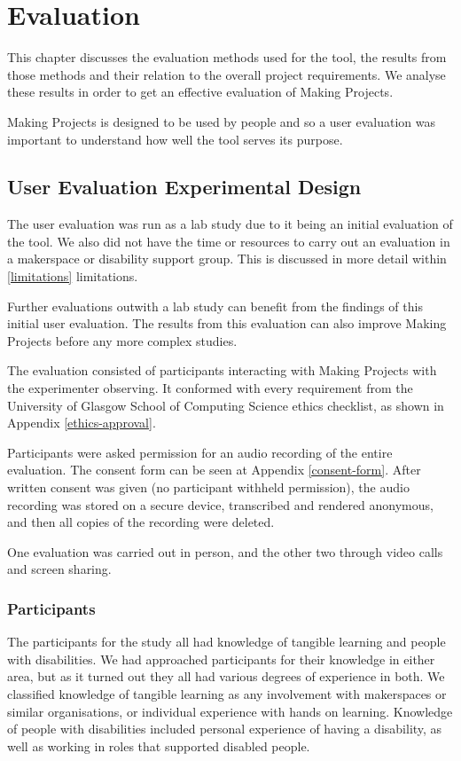 \documentclass{l4proj}
\begin{document}
\chapter{Evaluation} 
\label{evaluation}
This chapter discusses the evaluation methods used for the tool, the results from those methods and their relation to the overall project requirements. We analyse these results in order to get an effective evaluation of Making Projects. 

Making Projects is designed to be used by people and so a user evaluation was important to understand how well the tool serves its purpose. 


\section{User Evaluation Experimental Design}
The user evaluation was run as a lab study due to it being an initial evaluation of the tool. We also did not have the time or resources to carry out an evaluation in a makerspace or disability support group. This is discussed in more detail within \ref{limitations} limitations.

Further evaluations outwith a lab study can benefit from the findings of this initial user evaluation. The results from this evaluation can also improve Making Projects before any more complex studies. 

The evaluation consisted of participants interacting with Making Projects with the experimenter observing. It conformed with every requirement from the University of Glasgow School of Computing Science ethics checklist, as shown in Appendix \ref{ethics-approval}. 

Participants were asked permission for an audio recording of the entire evaluation. The consent form can be seen at Appendix \ref{consent-form}. After written consent was given (no participant withheld permission), the audio recording was stored on a secure device, transcribed and rendered anonymous, and then all copies of the recording were deleted. 

One evaluation was carried out in person, and the other two through video calls and screen sharing. 


\subsection{Participants}
\label{participants}
The participants for the study all had knowledge of tangible learning and people with disabilities. We had approached participants for their knowledge in either area, but as it turned out they all had various degrees of experience in both. We classified knowledge of tangible learning as any involvement with makerspaces or similar organisations, or individual experience with hands on learning. Knowledge of people with disabilities included personal experience of having a disability, as well as working in roles that supported disabled people. 
\end{document}

